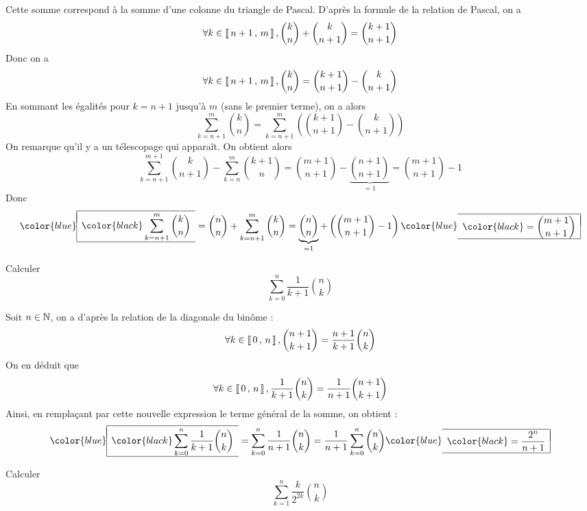 \documentclass{fancybook}
\newcommand{\lboxed}[1]{{\color{blue}\begin{array}{|l}\hline\\[-2.4ex]{\color{black}#1}\\[1.2ex]\hline\end{array}}}
\newcommand{\rboxed}[1]{{\color{blue}\begin{array}{r|}\hline\\[-2.4ex]{\color{black}#1}\\[1.2ex]\hline\end{array}}}
\begin{document}
\begin{solution}
Cette somme correspond à la somme d'une colonne du triangle de Pascal. D'après la formule de la relation de Pascal, on a 
\[
\forall k \in \left\llbracket \, n+1 \, , \, m \, \right\rrbracket,\binom{k}{n} + \binom{k}{n+1} = \binom{k+1}{n+1} 
\]
Donc on a
\[
\forall k \in \left\llbracket \, n+1 \, , \, m \, \right\rrbracket,\binom{k}{n} = \binom{k+1}{n+1} - \binom{k}{n+1}
\]
En sommant les égalités pour $k=n+1$ jusqu'à $m$ (sans le premier terme), on a alors
\[
\displaystyle\sum\limits_{k=n+1}^{m} \binom{k}{n} 
= \displaystyle\sum\limits_{k=n+1}^{m} \left(\binom{k+1}{n+1} - \binom{k}{n+1}\right)
\]
On remarque qu'il y a un télescopage qui apparaît. On obtient alors
\[
\displaystyle\sum\limits_{k=n+1}^{m+1} \binom{k}{n+1}
- \displaystyle\sum\limits_{k=n}^{m} \binom{k+1}{n}
= \binom{m+1}{n+1} - \underbrace{\binom{n+1}{n+1}}_{=1}
= \binom{m+1}{n+1} - 1
\]
Donc 
\[
\lboxed{\displaystyle\sum\limits_{k=n+1}^{m} \binom{k}{n}}
= \binom{n}{n} + \displaystyle\sum\limits_{k=n+1}^{m} \binom{k}{n} 
= \underbrace{\binom{n}{n}}_{=1} + \left(\binom{m+1}{n+1} - 1\right)
\rboxed{= \displaystyle\binom{m+1}{n+1}}
\]
\end{solution}

\begin{exercice}
Calculer 
\[
\displaystyle\sum\limits_{k=0}^{n} \dfrac{1}{k+1}\binom{n}{k}
\]
\end{exercice}

\begin{solution}
Soit $n \in \mathbb{N}$, on a d'après la relation de la diagonale du binôme :
\[\forall k \in \left\llbracket \, 0 \, , \, n \, \right\rrbracket, \binom{n+1}{k+1} = \dfrac{n+1}{k+1}\binom{n}{k}
\]
On en déduit que
\[
\forall k \in \left\llbracket \, 0 \, , \, n \, \right\rrbracket, \dfrac{1}{k+1}\binom{n}{k} = \dfrac{1}{n+1}\binom{n+1}{k+1}
\]
Ainsi, en remplaçant par cette nouvelle expression le terme général de la somme, on obtient :
\[
\lboxed{\displaystyle\sum\limits_{k=0}^{n} \dfrac{1}{k+1}\binom{n}{k}}
=  \displaystyle\sum\limits_{k=0}^{n} \dfrac{1}{n+1}\binom{n}{k} 
= \dfrac{1}{n+1} \displaystyle\sum\limits_{k=0}^{n} \binom{n}{k}
\rboxed{= \dfrac{2^n}{n+1}}
\]
\end{solution}

\begin{exercice}
Calculer 
\[
\displaystyle\sum\limits_{k=1}^{n} \dfrac{k}{2^{2k}}\binom{n}{k}
\]
\end{exercice}
\end{document}
